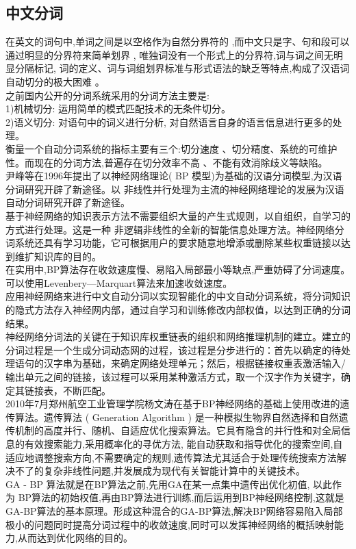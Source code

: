 \documentclass[a4paper,12pt]{article}
\begin{document}
\begin{CJK*}{UTF8}{gbsn}
	\subsection{中文分词}
	在英文的词句中,单词之间是以空格作为自然分界符的 ,而中文只是字、句和段可以通过明显的分界符来简单划界 , 唯独词没有一个形式上的分界符,词与词之间无明显分隔标记, 词的定义、词与词组划界标准与形式语法的缺乏等特点,构成了汉语词自动切分的极大困难 。\\
之前国内公开的分词系统采用的分词方法主要是:\\
1)机械切分: 运用简单的模式匹配技术的无条件切分。\\
2)语义切分: 对语句中的词义进行分析, 对自然语言自身的语言信息进行更多的处理。\\
衡量一个自动分词系统的指标主要有三个:切分速度 、切分精度、系统的可维护性。而现在的分词方法,普遍存在切分效率不高 、不能有效消除歧义等缺陷。\\
尹峰等在1996年提出了以神经网络理论( BP 模型)为基础的汉语分词模型,为汉语分词研究开辟了新途径。以 非线性并行处理为主流的神经网络理论的发展为汉语自动分词研究开辟了新途径。\\
基于神经网络的知识表示方法不需要组织大量的产生式规则，以自组织，自学习的方式进行处理。这是一种 非逻辑非线性的全新的智能信息处理方法。神经网络分词系统还具有学习功能，它可根据用户的要求随意地增添或删除某些权重链接以达到维扩知识库的目的。\\
在实用中,BP算法存在收敛速度慢、易陷入局部最小等缺点,严重妨碍了分词速度。可以使用Levenbery—Marquart算法来加速收敛速度。\\
	应用神经网络来进行中文自动分词以实现智能化的中文自动分词系统，将分词知识的隐式方法存入神经网内部，通过自学习和训练修改内部权值，以达到正确的分词结果。\\
	神经网络分词法的关键在于知识库权重链表的组织和网络推理机制的建立。建立的分词过程是一个生成分词动态网的过程，该过程是分步进行的：首先以确定的待处理语句的汉字串为基础，来确定网络处理单元；然后，根据链接权重表激活输入/输出单元之间的链接，该过程可以采用某种激活方式，取一个汉字作为关键字，确定其链接表，不断匹配。\\
	2010年7月郑州航空工业管理学院杨文涛在基于BP神经网络的基础上使用改进的遗传算法。遗传算法 ( Generation Algorithm ) 是一种模拟生物界自然选择和自然遗传机制的高度并行、随机、自适应优化搜索算法。它具有隐含的并行性和对全局信息的有效搜索能力,采用概率化的寻优方法, 能自动获取和指导优化的搜索空间,自适应地调整搜索方向,不需要确定的规则,遗传算法尤其适合于处理传统搜索方法解决不了的复杂非线性问题,并发展成为现代有关智能计算中的关键技术。\\
	GA - BP 算法就是在BP算法之前,先用GA在某一点集中遗传出优化初值, 以此作为 BP算法的初始权值,再由BP算法进行训练,而后运用到BP神经网络控制,这就是GA-BP算法的基本原理。形成这种混合的GA-BP算法,解决BP网络容易陷入局部极小的问题同时提高分词过程中的收敛速度,同时可以发挥神经网络的概括映射能力,从而达到优化网络的目的。 

\end{CJK*}
\end{document}
